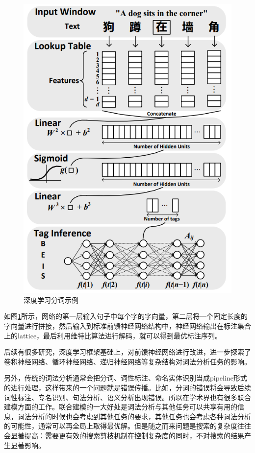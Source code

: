 \begin{figure}[h!]
\centering
\includegraphics[scale=0.5]{img/chapter_nlp/dl_segmentation_example.png}
\caption{深度学习分词示例}
\label{fig:dl_segmentation_example}
\end{figure}

如图\ref{fig:dl_segmentation_example}所示，网络的第一层输入句子中每个字的字向量，第二层将一个固定长度的字向量进行拼接，然后输入到标准前馈神经网络结构中，神经网络输出在标注集合上的lattice，最后利用维特比算法进行解码，就可以得到最优标注序列。

后续有很多研究，深度学习框架基础上，对前馈神经网络进行改进，进一步探索了卷积神经网络\cite{wu2019neural}、循环神经网络\cite{chen2015long}、递归神经网络\cite{chen2015gated}等复杂结构对词法分析任务的影响。

另外，传统的词法分析通常会把分词、词性标注、命名实体识别当成pipeline形式的进行处理，这样带来的一个问题就是错误传播。比如，分词的错误将会导致后续词性标注、专名识别、句法分析、语义分析出现错误。所以在学术界也有很多联合建模\cite{zhang2008joint}\cite{hatori2012incremental}\cite{shao2017character}方面的工作。联合建模的一大好处是词法分析与其他任务可以共享有用的信息，词法分析的时候也会考虑到其他任务的要求，其他任务也会考虑各种词法分析的可能性，通常可以再全局上取得最优解。但是随之而来问题是搜索的复杂度往往会显著提高：需要更有效的搜索剪枝机制在控制复杂度的同时，不对搜索的结果产生显著影响。

